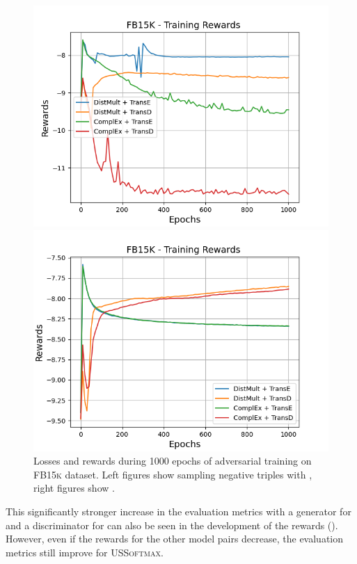 \begin{figure}[H]
\begin{minipage}{.5\textwidth}
      \includegraphics[width=0.9\linewidth]{figures/results/gan_train/not_pretrained/uncertainty/max/entropy/fb15k/1k_epochs/uncertainty_fb15k_rew.png}
    \end{minipage}%
    \begin{minipage}{.5\textwidth}
      \centering
      \includegraphics[width=0.9\linewidth]{figures/results/gan_train/not_pretrained/uncertainty/max_distribution/entropy/fb15k/1k_epochs/uncertainty_fb15k_rew.png}
    \end{minipage}%
    \caption{Losses and rewards during 1000 epochs of adversarial training on \textsc{FB15k} dataset. 
    Left figures show sampling negative triples with \usmax, right figures show \ussoftmax.}
    \label{fig:advtrain_fb15k_usmax_ussoftmax_losses_rewards}
\end{figure}
This significantly stronger increase in the evaluation metrics with a \distmult generator for \usmax and a \transd discriminator for \ussoftmax can also be seen in the development of the rewards ().
However, even if the rewards for the other model pairs decrease, the evaluation metrics still improve for \textsc{USSoftmax}.
